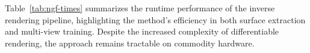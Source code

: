 Table~\ref{tab:ngf-times} summarizes the runtime performance of the inverse rendering pipeline, highlighting the method's efficiency in both surface extraction and multi-view training.
Despite the increased complexity of differentiable rendering, the approach remains tractable on commodity hardware.
